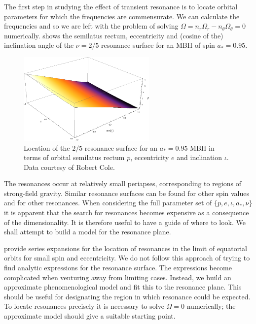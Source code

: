 The first step in studying the effect of transient resonance is to locate orbital parameters for which the frequencies are commensurate. We can calculate the frequencies and so we are left with the problem of solving $\Omega = n_r \Omega_r - n_\theta \Omega_\theta = 0$ numerically.  shows the semilatus rectum, eccentricity and (cosine of the) inclination angle of the $\nu = 2/5$ resonance surface for an MBH of spin $a_\ast = 0.95$. 
\begin{figure}%
\centering
\includegraphics[width=0.6\textwidth]{./images/Fig_res-2-5-95}
\caption{Location of the $2/5$ resonance surface for an $a_\ast = 0.95$ MBH in terms of orbital semilatus rectum $p$, eccentricity $e$ and inclination $\iota$. Data courtesy of Robert Cole.}\label{fig:res-plane-2-5-95}
\end{figure}
The resonances occur at relatively small periapses, corresponding to regions of strong-field gravity.
Similar resonance surfaces can be found for other spin values and for other resonances. When considering the full parameter set of $\{p,e,\iota,a_\ast,\nu\}$ it is apparent that the search for resonances becomes expensive as a consequence of the dimensionality. It is therefore useful to have a guide of where to look. We shall attempt to build a model for the resonance plane.

\citet{Brink2013} provide series expansions for the location of resonances in the limit of equatorial orbits for small spin and eccentricity. We do not follow this approach of trying to find analytic expressions for the resonance surface. The expressions become complicated when venturing away from limiting cases. Instead, we build an approximate phenomenological model and fit this to the resonance plane. %
This should be useful for designating the region in which resonance could be expected. To locate resonances precisely it is necessary to solve $\Omega = 0$ numerically; the approximate model should give a suitable starting point.

